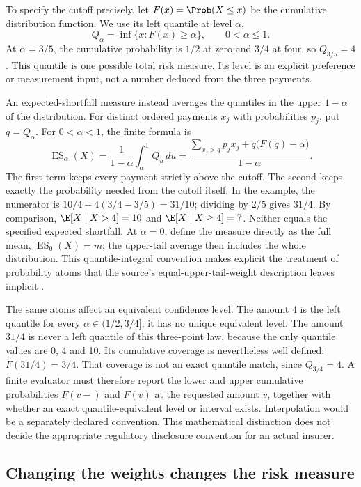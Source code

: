 To specify the cutoff precisely, let $F(x)=\Prob(X\leq x)$ be the cumulative
distribution function. We use its left quantile at level $\alpha$,
\[
 Q_\alpha=\inf\{x:F(x)\geq\alpha\},\qquad 0<\alpha\leq1.
\]
At $\alpha=3/5$, the cumulative probability is $1/2$ at zero and $3/4$ at
four, so $Q_{3/5}=4$. This quantile is one possible total risk measure.
Its level is an explicit preference or measurement input, not a number
deduced from the three payments.

An expected-shortfall measure instead averages the quantiles in the upper
$1-\alpha$ of the distribution. For distinct ordered payments $x_j$ with
probabilities $p_j$, put $q=Q_\alpha$. For $0<\alpha<1$, the finite formula is
\[
 \operatorname{ES}_\alpha(X)
 =\frac{1}{1-\alpha}\int_\alpha^1 Q_u\,du
 =\frac{\displaystyle\sum_{x_j>q}p_jx_j
             +q\bigl(F(q)-\alpha\bigr)}{1-\alpha}.
\]
The first term keeps every payment strictly above the cutoff. The second
keeps exactly the probability needed from the cutoff itself. In the example,
the numerator is $10/4+4(3/4-3/5)=31/10$; dividing by $2/5$ gives $31/4$.
By comparison, $\E[X\mid X>4]=10$ and $\E[X\mid X\geq4]=7$.
Neither equals the specified expected shortfall. At $\alpha=0$, define the
measure directly as the full mean, $\operatorname{ES}_0(X)=m$; the upper-tail
average then includes the whole distribution. This quantile-integral
convention makes explicit the treatment of probability atoms that the
source's equal-upper-tail-weight description leaves implicit
\citep[Section 6]{england2019lifetime}.

The same atoms affect an equivalent confidence level. The amount 4 is the
left quantile for every $\alpha\in(1/2,3/4]$; it has no unique equivalent
level. The amount $31/4$ is never a left quantile of this three-point law,
because the only quantile values are 0, 4 and 10. Its cumulative coverage is
nevertheless well defined: $F(31/4)=3/4$. That coverage is not an exact
quantile match, since $Q_{3/4}=4$. A finite evaluator must therefore report
the lower and upper cumulative probabilities $F(v-)$ and $F(v)$ at the
requested amount $v$, together with whether an exact quantile-equivalent
level or interval exists. Interpolation would be a separately declared
convention. This mathematical distinction does not decide the appropriate
regulatory disclosure convention for an actual insurer.

\subsection{Changing the weights changes the risk measure}


